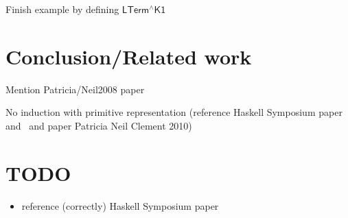 \documentclass[acmsmall,screen,review,anonymous]{acmart}
\theoremstyle{definition}
\begin{document}
{\color{red} Finish example by defining $\mathsf{LTerm^{\wedge}K1}$}






\section{Conclusion/Related work}

Mention Patricia/Neil2008 paper

No induction with primitive representation (reference Haskell Symposium paper and~\cite{jp19} and paper Patricia Neil Clement 2010)


\section{TODO}

\begin{itemize}
\item reference (correctly) Haskell Symposium paper
\end{itemize}


%
%



\end{document}
